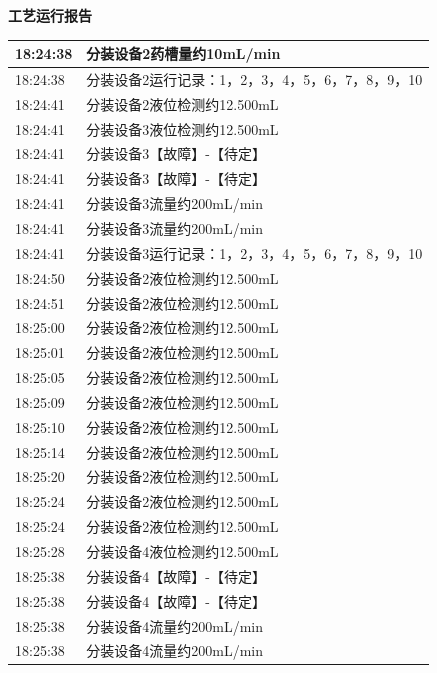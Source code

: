 \documentclass[UTF8,10pt,a4paper,fontset=fandol]{ctexart}
\begin{document}
\newpage

\begin{center}
\begin{minipage}[t]{0.46\linewidth}
\centering
\textbf{工艺运行报告}

\smallskip
\begin{tabular}{|p{1.05cm}|p{5.65cm}|}
\hline
18:24:38 & 分装设备2药槽量约10mL/min \\ \hline
18:24:38 & 分装设备2运行记录：1，2，3，4，5，6，7，8，9，10 \\ \hline
18:24:41 & 分装设备2液位检测约12.500mL \\ \hline
18:24:41 & 分装设备3液位检测约12.500mL \\ \hline
18:24:41 & 分装设备3【故障】-【待定】 \\ \hline
18:24:41 & 分装设备3【故障】-【待定】 \\ \hline
18:24:41 & 分装设备3流量约200mL/min \\ \hline
18:24:41 & 分装设备3流量约200mL/min \\ \hline
18:24:41 & 分装设备3运行记录：1，2，3，4，5，6，7，8，9，10 \\ \hline
18:24:50 & 分装设备2液位检测约12.500mL \\ \hline
18:24:51 & 分装设备2液位检测约12.500mL \\ \hline
18:25:00 & 分装设备2液位检测约12.500mL \\ \hline
18:25:01 & 分装设备2液位检测约12.500mL \\ \hline
18:25:05 & 分装设备2液位检测约12.500mL \\ \hline
18:25:09 & 分装设备2液位检测约12.500mL \\ \hline
18:25:10 & 分装设备2液位检测约12.500mL \\ \hline
18:25:14 & 分装设备2液位检测约12.500mL \\ \hline
18:25:20 & 分装设备2液位检测约12.500mL \\ \hline
18:25:24 & 分装设备2液位检测约12.500mL \\ \hline
18:25:24 & 分装设备2液位检测约12.500mL \\ \hline
18:25:28 & 分装设备4液位检测约12.500mL \\ \hline
18:25:38 & 分装设备4【故障】-【待定】 \\ \hline
18:25:38 & 分装设备4【故障】-【待定】 \\ \hline
18:25:38 & 分装设备4流量约200mL/min \\ \hline
18:25:38 & 分装设备4流量约200mL/min \\ \hline
\end{tabular}


\end{minipage}
\end{center}
\end{document}

